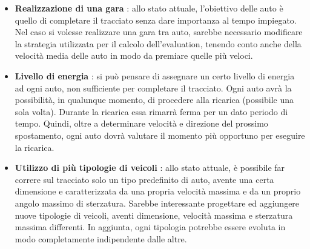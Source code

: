 \documentclass[a4paper,12pt]{article}
\begin{document}
\begin{itemize}
	\item \textbf{Realizzazione di una gara} : allo stato attuale, l'obiettivo delle auto è quello di completare il tracciato senza dare importanza al tempo impiegato. Nel caso si volesse realizzare una gara tra auto, sarebbe necessario modificare la strategia utilizzata per il calcolo dell'evaluation, tenendo conto anche della velocità media delle auto in modo da premiare quelle più veloci.
	\item \textbf{Livello di energia} : si può pensare di assegnare un certo livello di energia ad ogni auto, non sufficiente per completare il tracciato. Ogni auto avrà la possibilità, in qualunque momento, di procedere alla ricarica (possibile una sola volta). Durante la ricarica essa rimarrà ferma per un dato periodo di tempo. Quindi, oltre a determinare velocità e direzione del prossimo spostamento, ogni auto dovrà valutare il momento più opportuno per eseguire la ricarica.
	\item \textbf{Utilizzo di più tipologie di veicoli} : allo stato attuale, è possibile far correre sul tracciato solo un tipo predefinito di auto, avente una certa dimensione e caratterizzata da una propria velocità massima e da un proprio angolo massimo di sterzatura. Sarebbe interessante progettare ed aggiungere nuove tipologie di veicoli, aventi dimensione, velocità massima e sterzatura massima differenti. In aggiunta, ogni tipologia potrebbe essere evoluta in modo completamente indipendente dalle altre. 
\end{itemize}
\end{document}
